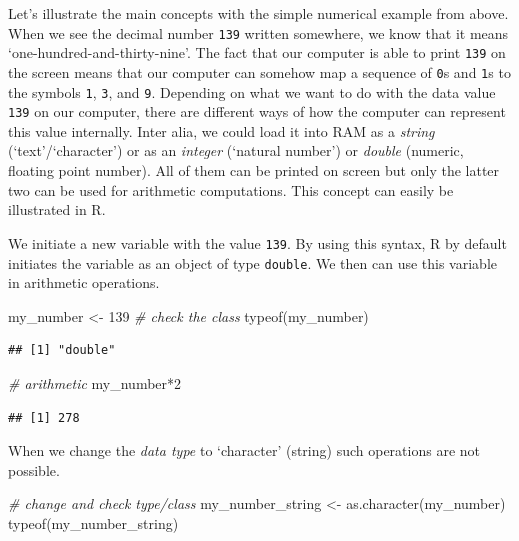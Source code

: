 \documentclass[
  12pt,
]{style/krantz}
\newenvironment{Shaded}{\begin{snugshade}}{\end{snugshade}}
\newcommand{\CommentTok}[1]{\textcolor[rgb]{0.56,0.35,0.01}{\textit{#1}}}
\newcommand{\DecValTok}[1]{\textcolor[rgb]{0.00,0.00,0.81}{#1}}
\newcommand{\FunctionTok}[1]{\textcolor[rgb]{0.00,0.00,0.00}{#1}}
\newcommand{\NormalTok}[1]{#1}
\newcommand{\OtherTok}[1]{\textcolor[rgb]{0.56,0.35,0.01}{#1}}
\newcommand{\SpecialCharTok}[1]{\textcolor[rgb]{0.00,0.00,0.00}{#1}}
\begin{document}
Let's illustrate the main concepts with the simple numerical example from above. When we see the decimal number \texttt{139} written somewhere, we know that it means `one-hundred-and-thirty-nine'. The fact that our computer is able to print \texttt{139} on the screen means that our computer can somehow map a sequence of \texttt{0}s and \texttt{1}s to the symbols \texttt{1}, \texttt{3}, and \texttt{9}. Depending on what we want to do with the data value \texttt{139} on our computer, there are different ways of how the computer can represent this value internally. Inter alia, we could load it into RAM as a \emph{string} (`text'/`character') or as an \emph{integer} (`natural number') or \emph{double} (numeric, floating point number). All of them can be printed on screen but only the latter two can be used for arithmetic computations. This concept can easily be illustrated in R.

We initiate a new variable with the value \texttt{139}. By using this syntax, R by default initiates the variable as an object of type \texttt{double}. We then can use this variable in arithmetic operations.

\begin{Shaded}
\begin{Highlighting}[]
\NormalTok{my\_number }\OtherTok{\textless{}{-}} \DecValTok{139}
\CommentTok{\# check the class}
\FunctionTok{typeof}\NormalTok{(my\_number)}
\end{Highlighting}
\end{Shaded}

\begin{verbatim}
## [1] "double"
\end{verbatim}

\begin{Shaded}
\begin{Highlighting}[]
\CommentTok{\# arithmetic}
\NormalTok{my\_number}\SpecialCharTok{*}\DecValTok{2}
\end{Highlighting}
\end{Shaded}

\begin{verbatim}
## [1] 278
\end{verbatim}

When we change the \emph{data type} to `character' (string) such operations are not possible.

\begin{Shaded}
\begin{Highlighting}[]
\CommentTok{\# change and check type/class}
\NormalTok{my\_number\_string }\OtherTok{\textless{}{-}} \FunctionTok{as.character}\NormalTok{(my\_number)}
\FunctionTok{typeof}\NormalTok{(my\_number\_string)}
\end{Highlighting}
\end{Shaded}
\end{document}
